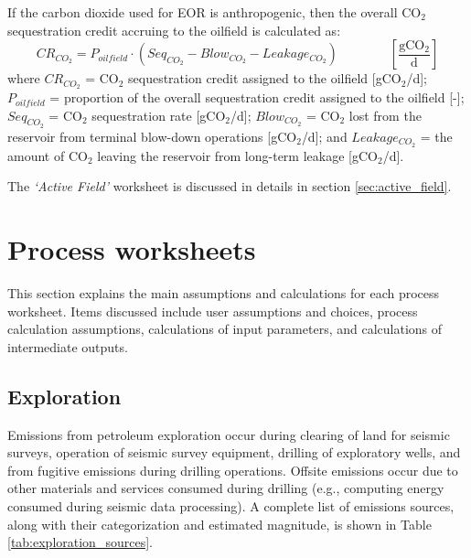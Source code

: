 \documentclass[11pt]{report}
\newcommand{\sheet}[1]{\textit{`{#1}'}}
\newcommand{\eqnunitfrac}[2]{\quad\quad \scriptstyle{\left[\frac{\text{#1}}{\text{#2}}\right]}}
\begin{document}
If the carbon dioxide used for EOR is anthropogenic, then the overall CO$_2$ sequestration credit accruing to the oilfield is calculated as:
\begin{equation} \label{eq:SequestrationCredit}
CR_{CO_{2}} = P_{oilfield} \cdot (Seq_{CO_{2}} - Blow_{CO_{2}} - Leakage_{CO_{2}}) \quad\quad\eqnunitfrac{gCO$_2$}{d}
\end{equation}
 where $CR_{CO_{2}}$ = CO$_2$ sequestration credit assigned to the oilfield [gCO$_2$/d]; $P_{oilfield}$ = proportion of the overall sequestration credit assigned to the oilfield [-]; $Seq_{CO_{2}}$ = CO$_2$ sequestration rate [gCO$_2$/d]; $Blow_{CO_{2}}$ = CO$_2$ lost from the reservoir from terminal blow-down operations [gCO$_2$/d]; and $Leakage_{CO_{2}}$ = the amount of CO$_2$ leaving the reservoir from long-term leakage [gCO$_2$/d].
 
 The \sheet{Active Field} worksheet is discussed in details in section \ref{sec:active_field}.





\chapter{Process worksheets}

This section explains the main assumptions and calculations for each process worksheet. Items discussed include user assumptions and choices, process calculation assumptions, calculations of input parameters, and calculations of intermediate outputs.


\clearpage
\section{Exploration}\label{sec:exploration}

Emissions from petroleum exploration occur during clearing of land for seismic surveys, operation of seismic survey equipment, drilling of exploratory wells, and from fugitive emissions during drilling operations. Offsite emissions occur due to other materials and services consumed during drilling (e.g., computing energy consumed during seismic data processing). A complete list of emissions sources, along with their categorization and estimated magnitude, is shown in Table \ref{tab:exploration_sources}.
\end{document}
